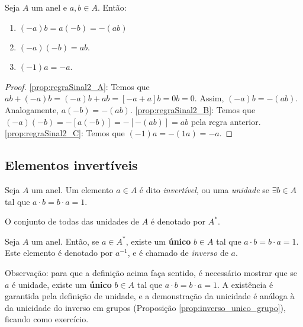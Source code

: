 \begin{prop}\label{prop:regraSinal2}
    Seja $A$ um anel e $a, b \in A$. Então:
    \begin{enumerate}[label=\alph*)]
        \item $(-a)b=a(-b)=-(ab)$\label{prop:regraSinal2_A}
        \item $(-a)(-b)=ab$.\label{prop:regraSinal2_B}
        \item $(-1)a=-a$.\label{prop:regraSinal2_C}
    \end{enumerate}
\end{prop}
\begin{proof}
    \ref{prop:regraSinal2_A}: Temos que $ab+(-a)b=(-a)b+ab=[-a+a]b=0b=0$. Assim, $(-a)b=-(ab)$. Analogamente, $a(-b)=-(ab)$.
    \ref{prop:regraSinal2_B}: Temos que $(-a)(-b)=-[a(-b)]=-[-(ab)]=ab$ pela regra anterior.
    \ref{prop:regraSinal2_C}: Temos que $(-1)a=-(1a)=-a$.

\end{proof}

\subsection{Elementos invertíveis}
\begin{definition}
    Seja $A$ um anel. Um elemento $a \in A$ é dito \emph{invertível}, ou uma \emph{unidade} se $\exists b \in A$ tal que $a \cdot b = b \cdot a = 1$.
    
    O conjunto de todas das unidades de $A$ é denotado por $A^*$.
\end{definition}

\begin{definition}
    Seja $A$ um anel. Então, se $a \in A^*$, existe um \textbf{único} $b \in A$ tal que $a \cdot b = b \cdot a = 1$. Este elemento é denotado por $a^{-1}$, e é chamado de \emph{inverso} de $a$.
\end{definition}

Observação: para que a definição acima faça sentido, é necessário mostrar que se $a$ é unidade, existe um \textbf{único} $b \in A$ tal que $a \cdot b = b \cdot a = 1$. A existência é garantida pela definição de unidade, e a demonstração da unicidade é análoga à da unicidade do inverso em grupos (Proposição \ref{prop:inverso_unico_grupo}), ficando como exercício.

